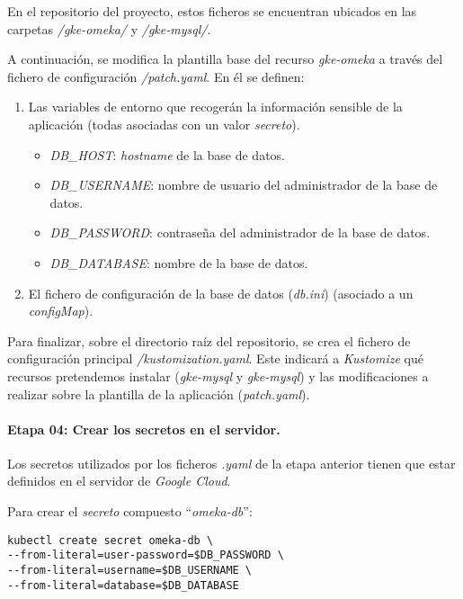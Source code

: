 En el repositorio del proyecto, estos ficheros se encuentran ubicados en
las carpetas \emph{/gke-omeka/} y \emph{/gke-mysql/}.

A continuación, se modifica la plantilla base del recurso
\emph{gke-omeka} a través del fichero de configuración
\emph{/patch.yaml}. En él se definen:

\begin{enumerate}
\def\labelenumi{\arabic{enumi}.}
\tightlist
\item
  Las variables de entorno que recogerán la información sensible de la
  aplicación (todas asociadas con un valor \emph{secreto}).

  \begin{itemize}
  \tightlist
  \item
    \emph{DB\_HOST}: \emph{hostname} de la base de datos.
  \item
    \emph{DB\_USERNAME}: nombre de usuario del administrador de la base
    de datos.
  \item
    \emph{DB\_PASSWORD}: contraseña del administrador de la base de
    datos.
  \item
    \emph{DB\_DATABASE}: nombre de la base de datos.
  \end{itemize}
\item
  El fichero de configuración de la base de datos (\emph{db.ini})
  (asociado a un \emph{configMap}).
\end{enumerate}

Para finalizar, sobre el directorio raíz del repositorio, se crea el
fichero de configuración principal \emph{/kustomization.yaml}. Este
indicará a \emph{Kustomize} qué recursos pretendemos instalar
(\emph{gke-mysql} y \emph{gke-mysql}) y las modificaciones a realizar
sobre la plantilla de la aplicación (\emph{patch.yaml}).


\paragraph{Etapa 04: Crear los secretos en el servidor.}

Los secretos utilizados por los ficheros \emph{.yaml} de la etapa
anterior tienen que estar definidos en el servidor de \emph{Google
Cloud}.

Para crear el \emph{secreto} compuesto ``\emph{omeka-db}'':

\begin{verbatim}
kubectl create secret omeka-db \
--from-literal=user-password=$DB_PASSWORD \
--from-literal=username=$DB_USERNAME \
--from-literal=database=$DB_DATABASE
\end{verbatim}

